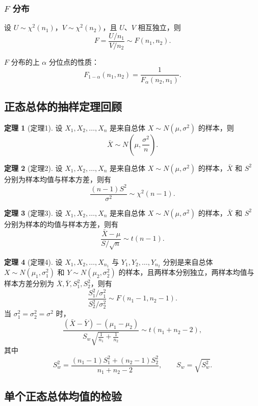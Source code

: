 \documentclass[11pt,a4paper]{report}
\theoremstyle{definition}
\newtheorem{theorem}{定理}[chapter]
\begin{document}
\subsubsection*{$F$ 分布}

设 $U\sim\chi^{2}(n_{1})$，$V\sim\chi^{2}(n_{2})$，且 $U$、$V$ 相互独立，则
\[
F=\frac{U/n_{1}}{V/n_{2}}\sim F(n_{1},n_{2}).
\]

$F$ 分布的上 $\alpha$ 分位点的性质：
\[
F_{1-\alpha}(n_{1},n_{2})=\frac{1}{F_{\alpha}(n_{2},n_{1})}.
\]

\subsection{正态总体的抽样定理回顾}

\begin{theorem}[定理1]
设 $X_{1},X_{2},\ldots,X_{n}$ 是来自总体 $X\sim N(\mu,\sigma^{2})$ 的样本，则
\[
\bar{X}\sim N\!\left(\mu,\frac{\sigma^{2}}{n}\right).
\]
\end{theorem}

\begin{theorem}[定理2]
设 $X_{1},X_{2},\ldots,X_{n}$ 是来自总体 $X\sim N(\mu,\sigma^{2})$ 的样本，$\bar{X}$ 和 $S^{2}$ 分别为样本均值与样本方差，则有
\[
\frac{(n-1)S^{2}}{\sigma^{2}}\sim\chi^{2}(n-1).
\]
\end{theorem}

\begin{theorem}[定理3]
设 $X_{1},X_{2},\ldots,X_{n}$ 是来自总体 $X\sim N(\mu,\sigma^{2})$ 的样本，$\bar{X}$ 和 $S^{2}$ 分别为样本的均值与样本方差，则有
\[
\frac{\bar{X}-\mu}{S/\sqrt{n}}\sim t(n-1).
\]
\end{theorem}

\begin{theorem}[定理4]
设 $X_{1},X_{2},\ldots,X_{n_{1}}$ 与 $Y_{1},Y_{2},\ldots,Y_{n_{2}}$ 分别是来自总体 $X\sim N(\mu_{1},\sigma_{1}^{2})$ 和 $Y\sim N(\mu_{2},\sigma_{2}^{2})$ 的样本，且两样本分别独立，两样本均值与样本方差分别为 $\bar{X},\bar{Y},S_{1}^{2},S_{2}^{2}$，则有
\[
\frac{S_{1}^{2}/\sigma_{1}^{2}}{S_{2}^{2}/\sigma_{2}^{2}}\sim F(n_{1}-1,n_{2}-1).
\]
当 $\sigma_{1}^{2}=\sigma_{2}^{2}=\sigma^{2}$ 时，
\[
\frac{(\bar{X}-\bar{Y})-(\mu_{1}-\mu_{2})}{S_{w}\sqrt{\frac{1}{n_{1}}+\frac{1}{n_{2}}}}\sim t(n_{1}+n_{2}-2),
\]
其中
\[
S_{w}^{2}=\frac{(n_{1}-1)S_{1}^{2}+(n_{2}-1)S_{2}^{2}}{n_{1}+n_{2}-2},\qquad S_{w}=\sqrt{S_{w}^{2}}.
\]
\end{theorem}

\subsection{单个正态总体均值的检验}
\end{document}
